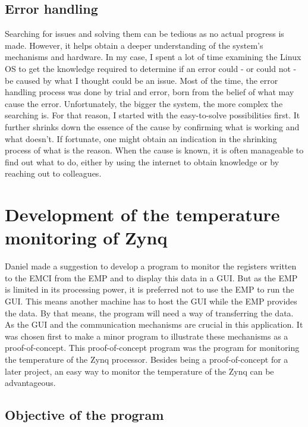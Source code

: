\subsection*{Error handling}
\noindent Searching for issues and solving them can be tedious as no actual progress is made. However, it helps obtain a deeper understanding of the system's mechanisms and hardware. In my case, I spent a lot of time examining the Linux OS to get the knowledge required to determine if an error could - or could not - be caused by what I thought could be an issue. Most of the time, the error handling process was done by trial and error, born from the belief of what may cause the error. Unfortunately, the bigger the system, the more complex the searching is. For that reason, I started with the easy-to-solve possibilities first. It further shrinks down the essence of the cause by confirming what is working and what doesn't. If fortunate, one might obtain an indication in the shrinking process of what is the reason. When the cause is known, it is often manageable to find out what to do, either by using the internet to obtain knowledge or by reaching out to colleagues.

\section{Development of the temperature monitoring of Zynq} \label{sc:temp}
Daniel made a suggestion to develop a program to monitor the registers written to the EMCI from the EMP and to display this data in a GUI. But as the EMP is limited in its processing power, it is preferred not to use the EMP to run the GUI. This means another machine has to host the GUI while the EMP provides the data. By that means, the program will need a way of transferring the data. \\

\noindent As the GUI and the communication mechanisms are crucial in this application. It was chosen first to make a minor program to illustrate these mechanisms as a proof-of-concept. This proof-of-concept program was the program for monitoring the temperature of the Zynq processor. Besides being a proof-of-concept for a later project, an easy way to monitor the temperature of the Zynq can be advantageous.

\subsection*{Objective of the program}

